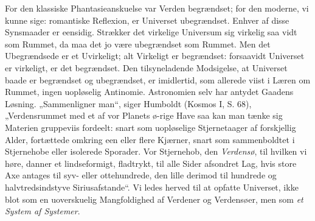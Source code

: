 \documentclass[12pt,a4paper]{book}
\begin{document}
For den klassiske Phantasieanskuelse var Verden begrændset; for den
moderne, vi kunne sige: romantiske Reflexion, er Universet
ubegrændset. Enhver af disse Synsmaader er eensidig. Strækker det
virkelige Universum sig virkelig saa vidt som Rummet, da maa det jo
være ubegrændset som Rummet. Men det Ubegrændsede er et Uvirkeligt; alt
Virkeligt er begrændset: forsaavidt Universet er virkeligt, er det
begrændset. Den tilsyneladende Modsigelse, at Universet baade er
begrændset og ubegrændset, er imidlertid, som allerede viist i Læren om
Rummet, ingen uopløselig Antinomie. Astronomien selv har antydet
Gaadens Løsning. „Sammenligner man“, siger Humboldt (Kosmos I, S. 68),
„Verdensrummet med et af vor Planets ø-rige Have saa kan man tænke sig
Materien gruppeviis fordeelt: snart som uopløselige Stjernetaager af
forskjellig Alder, fortættede omkring een eller flere Kjærner, snart
som sammenboldtet i Stjernehobe eller isolerede Sporader. Vor
Stjernehob, den \emph{Verdensø}, til hvilken vi høre, danner et
lindseformigt, fladtrykt, til alle Sider afsondret Lag, hvis store Axe
antages til syv- eller ottehundrede, den lille derimod til hundrede og
halvtredsindstyve Siriusafstande“. Vi ledes herved til at opfatte
Universet, ikke blot som en uoverskuelig Mangfoldighed af Verdener og
Verdensøer, men som \emph{et System af Systemer}.
\end{document}
